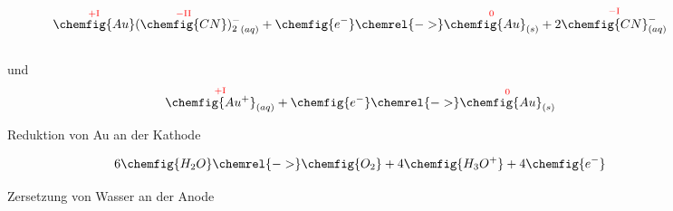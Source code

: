 \begin{figure}[H]\centering
    $${\overset{\mathrm{\color{red}{+I}}}{\chemfig{Au}} (\overset{\mathrm{\color{red}{-II}}}{\chemfig{CN}})_2^{-}}_{(aq)} + \chemfig{e^{-}} \chemrel{->} \overset{\mathrm{\color{red}{0}}}{\chemfig{Au}_{(s)}} + 2\overset{\mathrm{\color{red}{-I}}}{\chemfig{CN}^{-}_{(aq)}}$$
    \\ und \\
    $$\overset{\mathrm{\color{red}{+I}}}{\chemfig{Au^{+}}_{(aq)}} + \chemfig{e^{-}} \chemrel{->} \overset{\mathrm{\color{red}{0}}}{\chemfig{Au}_{(s)}}$$
    \caption{Reduktion von Au an der Kathode}
    $$6\chemfig{H_2O} \chemrel{->} \chemfig{O_2} + 4\chemfig{H_3O^{+}} + 4\chemfig{e^{-}}$$
    \caption{Zersetzung von Wasser an der Anode}
\end{figure}